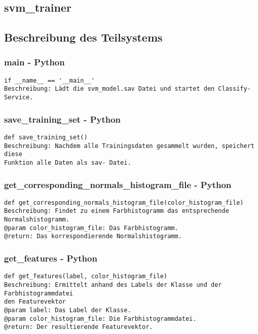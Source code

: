 \documentclass{suturo}
\begin{document}
\subsection{svm\_trainer}
\begin{figure}[!htb]
\end{figure}
      
\subsection{Beschreibung des Teilsystems}

\subsubsection{main - Python}
\begin{verbatim}
if __name__ == '__main__'
Beschreibung: Lädt die svm_model.sav Datei und startet den Classify- Service.
\end{verbatim}

\subsubsection{save\_training\_set - Python}
\begin{verbatim}
def save_training_set()
Beschreibung: Nachdem alle Trainingsdaten gesammelt wurden, speichert diese 
Funktion alle Daten als sav- Datei.
\end{verbatim}

\subsubsection{get\_corresponding\_normals\_histogram\_file - Python}
\begin{verbatim}
def get_corresponding_normals_histogram_file(color_histogram_file)
Beschreibung: Findet zu einem Farbhistogramm das entsprechende Normalshistogramm. 
@param color_histogram_file: Das Farbhistogramm.
@return: Das korrespondierende Normalshistogramm.
\end{verbatim}

\subsubsection{get\_features - Python}
\begin{verbatim}
def get_features(label, color_histogram_file)
Beschreibung: Ermittelt anhand des Labels der Klasse und der Farbhistogrammdatei 
den Featurevektor
@param label: Das Label der Klasse.
@param color_histogram_file: Die Farbhistogrammdatei.
@return: Der resultierende Featurevektor.
\end{verbatim}
\end{document}
